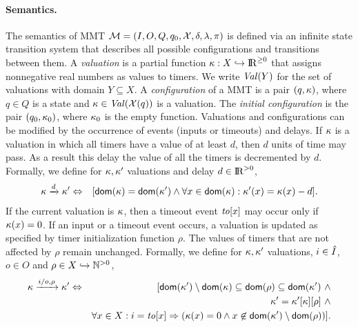 \paragraph{Semantics.}
The semantics of MMT ${\cal M} = (I, O, Q, q_0, \mathcal{X}, \delta, \lambda, \pi)$ is defined via an infinite state transition system that describes all possible
configurations and transitions between them.
A \emph{valuation} is a partial function
$\kappa : X \hookrightarrow {\rm I\!R}^{\geq 0}$ that assigns nonnegative real numbers as values to timers.
We write $\mathit{Val}({Y})$ for the set of valuations with domain $Y \subseteq X$.
A \emph{configuration} of a MMT is a pair $(q,\kappa)$, where $q \in Q$ is a state and $\kappa\in\mathit{Val}({\mathcal{X}(q)})$ is a valuation.
The \emph{initial configuration} is the pair $(q_0, \kappa_0)$, where $\kappa_0$ is the empty function.
Valuations and configurations can be modified by the occurrence of events (inputs or timeouts) and delays.
If $\kappa$ is a valuation in which all timers
have a value of at least $d$, then $d$ units of time may pass. As a result this delay the value of all the timers is decremented by $d$.
Formally, we define for $\kappa, \kappa'$ valuations and delay $d \in {\rm I\!R}^{> 0}$,
\begin{eqnarray*}
\kappa \xrightarrow{d} \kappa' & \Leftrightarrow & [{\textsf{dom}}(\kappa) = {\textsf{dom}}(\kappa') \wedge \forall x \in{\textsf{dom}}(\kappa) : \kappa'(x) = \kappa(x) - d ].
\end{eqnarray*}
If the current valuation is $\kappa$, then a timeout event $\mathit{to}[x]$ may occur only if $\kappa(x)=0$.
If an input or a timeout event occurs, a valuation is updated as specified by timer initialization function $\rho$.
The values of timers that are not affected by $\rho$ remain unchanged.
Formally, we define for $\kappa, \kappa'$ valuations, $i \in \hat{I}$, $o \in O$ and $\rho \in X \hookrightarrow {\mathbb N}^{>0}$,
\begin{eqnarray*}
\kappa \xrightarrow{i/o, \rho}  \kappa' & \Leftrightarrow & [ {\textsf{dom}}(\kappa') \setminus {\textsf{dom}}(\kappa)  \subseteq {\textsf{dom}}(\rho) \subseteq {\textsf{dom}}(\kappa') ~ \wedge\\
&& \kappa' =  \kappa'[\kappa][\rho] ~ \wedge \\
&& \forall x \in X : i=\mathit{to}[x] \Rightarrow (\kappa(x) = 0 \wedge x \not\in{\textsf{dom}}(\kappa') \setminus {\textsf{dom}}(\rho))].
\end{eqnarray*}

